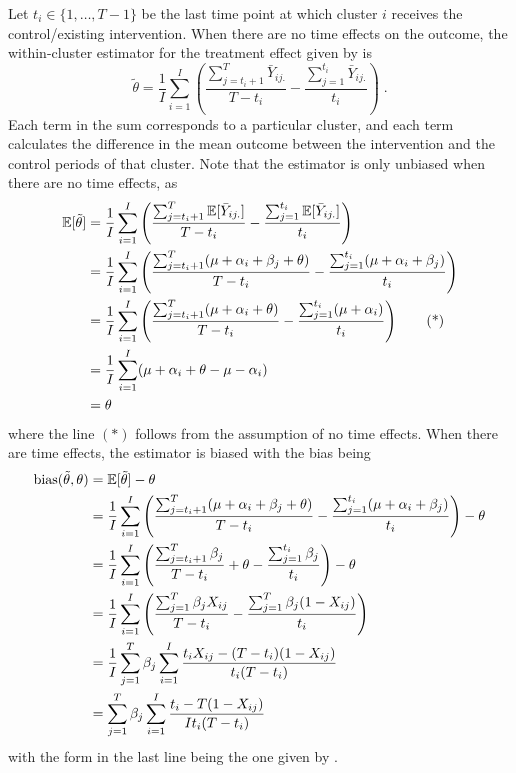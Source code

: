 \documentclass[10pt]{article}
\begin{document}
Let $t_i\in\{1,\ldots,T-1\}$ be the last time point at which cluster $i$ receives the control/existing intervention. When there are no time effects on the outcome, the within-cluster estimator for the treatment effect given by \textcite{Hussey:2007} is
\[
\tilde{\theta} = \frac{1}{I}\sum_{i=1}^I\left(\frac{\sum_{j=t_i+1}^T\bar{Y}_{ij.}}{T-t_i} - \frac{\sum_{j=1}^{t_i}\bar{Y}_{ij.}}{t_i}\right)\;.
\]
Each term in the sum corresponds to a particular cluster, and each term calculates the difference in the mean outcome between the intervention and the control periods of that cluster. Note that the estimator is only unbiased when there are no time effects, as
\begin{align*}
\mathbb{E}[\tilde{\theta}] &= \frac{1}{I}\sum_{i=1}^I\left(\frac{\sum_{j=t_i+1}^T\mathbb{E}[\bar{Y}_{ij.}]}{T-t_i} - \frac{\sum_{j=1}^{t_i}\mathbb{E}[\bar{Y}_{ij.}]}{t_i}\right) \\
&= \frac{1}{I}\sum_{i=1}^I\left(\frac{\sum_{j=t_i+1}^T(\mu+\alpha_i+\beta_j+\theta)}{T-t_i} - \frac{\sum_{j=1}^{t_i}(\mu+\alpha_i+\beta_j)}{t_i}\right) \\
&= \frac{1}{I}\sum_{i=1}^I\left(\frac{\sum_{j=t_i+1}^T(\mu+\alpha_i+\theta)}{T-t_i} - \frac{\sum_{j=1}^{t_i}(\mu+\alpha_i)}{t_i}\right) \tag{*} \\
&= \frac{1}{I}\sum_{i=1}^I(\mu+\alpha_i+\theta-\mu-\alpha_i) \\
&= \theta
\end{align*}
where the line $(*)$ follows from the assumption of no time effects. When there are time effects, the estimator is biased with the bias being
\begin{align*}
\mathrm{bias}(\tilde{\theta},\theta) &= \mathbb{E}[\tilde{\theta}] - \theta \\
&= \frac{1}{I}\sum_{i=1}^I\left(\frac{\sum_{j=t_i+1}^T(\mu+\alpha_i+\beta_j+\theta)}{T-t_i} - \frac{\sum_{j=1}^{t_i}(\mu+\alpha_i+\beta_j)}{t_i}\right) - \theta \\
&= \frac{1}{I}\sum_{i=1}^I\left(\frac{\sum_{j=t_i+1}^T\beta_j}{T-t_i} + \theta - \frac{\sum_{j=1}^{t_i}\beta_j}{t_i}\right) - \theta \\
&= \frac{1}{I}\sum_{i=1}^I\left(\frac{\sum_{j=1}^T\beta_jX_{ij}}{T-t_i} - \frac{\sum_{j=1}^T\beta_j(1-X_{ij})}{t_i}\right) \\
&= \frac{1}{I}\sum_{j=1}^T\beta_j\sum_{i=1}^I\frac{t_iX_{ij} - (T-t_i)(1-X_{ij})}{t_i(T-t_i)} \\
&= \sum_{j=1}^T\beta_j\sum_{i=1}^I\frac{t_i - T(1-X_{ij})}{It_i(T-t_i)}
\end{align*}
with the form in the last line being the one given by \citeauthor{Hussey:2007}.
\end{document}
